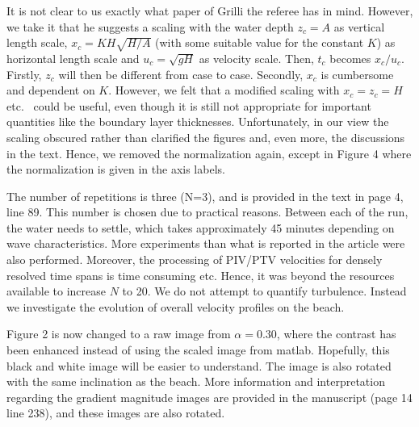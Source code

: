 \documentclass[11pt]{article}
\begin{document}
It is not clear to us exactly what paper of Grilli the referee has in mind. However, we take it that he suggests a scaling
with the water depth $z_c = A$ as vertical length scale, $x_c=KH\sqrt{H/A}$ (with some suitable value for the constant $K$)
as horizontal length scale and $u_c=\sqrt{gH}$ as velocity scale. Then, $t_c$ becomes $x_c/u_c$. Firstly, $z_c$ will then be different from 
case to case. Secondly, $x_c$ is cumbersome and dependent on $K$. However, we felt that a modified scaling with $x_c=z_c=H$ etc.~
could be useful, even though it is still not appropriate for important quantities like the boundary layer thicknesses. Unfortunately, in our view the scaling obscured rather than clarified the figures and, even more, the discussions in the text. Hence, we removed the normalization again, except in Figure 4 where the normalization is given in the axis labels.

The number of repetitions is three (N=3), and is provided in the text in page 4, line 89. This number is chosen due to practical reasons. Between each of the run, the water needs to settle, which takes approximately 45 minutes depending on wave characteristics. More experiments than what is reported in the article were also performed. Moreover, the processing of PIV/PTV velocities for densely resolved time spans is time consuming etc. Hence, it was beyond the resources available to increase $N$ to 20.  
We do not attempt to quantify turbulence. Instead we investigate the evolution of overall velocity profiles on the beach.

Figure 2 is now changed to a raw image from $\alpha=0.30$, where the contrast has been enhanced instead of using the scaled image from matlab. Hopefully, this black and white image will be easier to understand. The image is also rotated with the same inclination as the beach. More information and interpretation regarding the gradient magnitude images are provided in the manuscript (page 14 line 238), and these images are also rotated.
\end{document}

